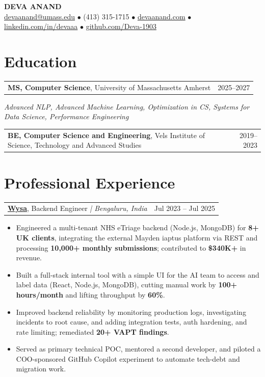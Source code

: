 \documentclass[letterpaper,11pt]{article}
\makeatletter
\newcommand{\eduItem}[3]{%
  \begin{tabular*}{\textwidth}{@{}l@{\extracolsep{\fill}}r@{}}
    \textbf{#1}, #2 & #3 \\
  \end{tabular*}\par
}
\newcommand{\expItem}[4]{%
  \vspace{3pt}
  \begin{tabular*}{\textwidth}{@{}l@{\extracolsep{\fill}}r@{}}
    \textbf{#1}, #2 \textit{| #3} & #4 \\
  \end{tabular*}\par\vspace{-2pt}
}
\makeatother
\begin{document}
\begin{center}
    {\fontsize{18}{20}\selectfont\bfseries DEVA ANAND}\\ \vspace{3pt}
    {\small
    \href{mailto:devaanand@umass.edu}{devaanand@umass.edu}
    \enspace$\bullet$\enspace
    (413) 315-1715
    \enspace$\bullet$\enspace
    \href{https://devaanand.com}{devaanand.com}
    \enspace$\bullet$\enspace
    \href{https://linkedin.com/in/devaaa/}{linkedin.com/in/devaaa}
    \enspace$\bullet$\enspace
    \href{https://github.com/Deva-1903}{github.com/Deva-1903}}
\end{center}
\vspace{-6pt}

\section{Education}
\eduItem{MS, Computer Science}{University of Massachusetts Amherst}{2025--2027}
{\small\textit{Advanced NLP, Advanced Machine Learning, Optimization in CS, Systems for Data Science, Performance Engineering}}\par
\vspace{3pt}
\eduItem{BE, Computer Science and Engineering}{Vels Institute of Science, Technology and Advanced Studies}{2019--2023}

\section{Professional Experience}

\expItem{\href{https://www.wysa.io}{Wysa}}{Backend Engineer}{Bengaluru, India}{Jul 2023 -- Jul 2025}
\begin{itemize}
  \item Engineered a multi-tenant NHS eTriage backend (Node.js, MongoDB) for \textbf{8+ UK clients}, integrating the external Mayden iaptus platform via REST and processing \textbf{10{,}000+ monthly submissions}; contributed to \textbf{\$340K+} in revenue.
  \item Built a full-stack internal tool with a simple UI for the AI team to access and label data (React, Node.js, MongoDB), cutting manual work by \textbf{100+ hours/month} and lifting throughput by \textbf{60\%}.
  \item Improved backend reliability by monitoring production logs, investigating incidents to root cause, and adding integration tests, auth hardening, and rate limiting; remediated \textbf{20+ VAPT findings}.
  \item Served as primary technical POC, mentored a second developer, and piloted a COO-sponsored GitHub Copilot experiment to automate tech-debt and migration work.
\end{itemize}
\end{document}
